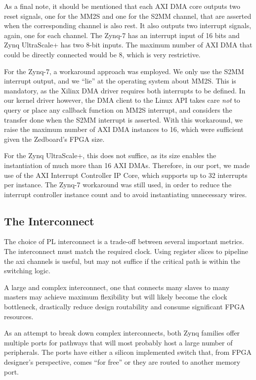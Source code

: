 As a final note, it should be mentioned that each AXI DMA core outputs two reset signals,
one for the MM2S and one for the S2MM channel, that are asserted when the corresponding channel is also rest.
It also outputs two interrupt signals, again, one for each channel. 
The Zynq-7 has an interrupt input of 16 bits and Zynq UltraScale+ has two 8-bit inputs.
The maximum number of AXI DMA that could be directly connected would be 8, which is very restrictive.

For the Zynq-7, a workaround approach was employed. We only use the S2MM interrupt output,
and we ``lie'' at the operating system about MM2S. This is mandatory, as the Xilinx DMA driver requires
both interrupts to be defined. In our kernel driver however, the DMA client to the Linux API takes
care \emph{not} to query or place any callback function on MM2S interrupt, and considers the transfer done
when the S2MM interrupt is asserted. With this workaround, we raise the maximum number of AXI DMA instances
to 16, which were sufficient given the Zedboard's FPGA size.

For the Zynq UltraScale+, this does not suffice, as its size enables the instantiation of much more than 16
AXI DMAs. Therefore, in our port, we made use of the AXI Interrupt Controller IP Core, which supports up
to 32 interrupts per instance. The Zynq-7 workaround was still used, in order to reduce the interrupt
controller instance count and to avoid instantiating unnecessary wires.

\subsection{The Interconnect}

The choice of PL interconnect is a trade-off between several important metrics.
The interconnect must match the required clock. 
Using register slices to pipeline the \gls{axi} channels is useful, 
but may not suffice if the critical path is within the switching logic.

A large and complex interconnect, one that connects many slaves to many masters
may achieve maximum flexibility but will likely become the clock bottleneck,
drastically reduce design routability and consume significant FPGA resources.

As an attempt to break down complex interconnects, both Zynq families
offer multiple ports for pathways that will most 
probably host a large number of peripherals.
The ports have either a silicon implemented switch that,
from FPGA designer's perspective, comes ``for free'' or they are routed to
another memory port. 

